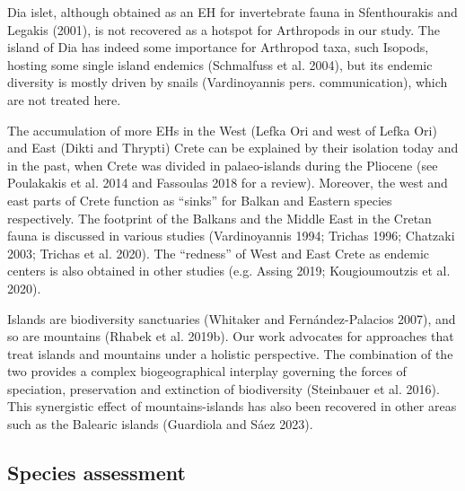 Dia islet, although obtained as an EH for invertebrate fauna in Sfenthourakis
and Legakis (2001), is not recovered as a hotspot for Arthropods in our study.
The island of Dia has indeed some importance for Arthropod taxa, such Isopods,
hosting some single island endemics (Schmalfuss et al. 2004), but its endemic
diversity is mostly driven by snails (Vardinoyannis pers. communication), which
are not treated here.

The accumulation of more EHs in the West (Lefka Ori and west of Lefka Ori) and
East (Dikti and Thrypti) Crete can be explained by their isolation today and in
the past, when Crete was divided in palaeo-islands during the Pliocene
(see Poulakakis et al. 2014 and Fassoulas 2018 for a review). Moreover, the
west and east parts of Crete function as “sinks'' for Balkan and Eastern
species respectively. The footprint of the Balkans and the Middle East in the
Cretan fauna is discussed in various studies (Vardinoyannis 1994; Trichas 1996; Chatzaki 2003; Trichas et al. 2020).
The “redness” of West and East Crete as endemic centers is also obtained in
other studies (e.g. Assing 2019; Kougioumoutzis et al. 2020). 

Islands are biodiversity sanctuaries (Whitaker and Fernández-Palacios 2007), and
so are mountains (Rhabek et al. 2019b). Our work advocates for approaches that
treat islands and mountains under a holistic perspective. The combination of
the two provides a complex biogeographical interplay governing the forces of
speciation, preservation and extinction of biodiversity (Steinbauer et al. 2016).
This synergistic effect of mountains-islands has also been recovered in other
areas such as the Balearic islands (Guardiola and Sáez 2023).

    \subsection{Species assessment}
    \label{subsec:arthropods-species-assessment-disc}

